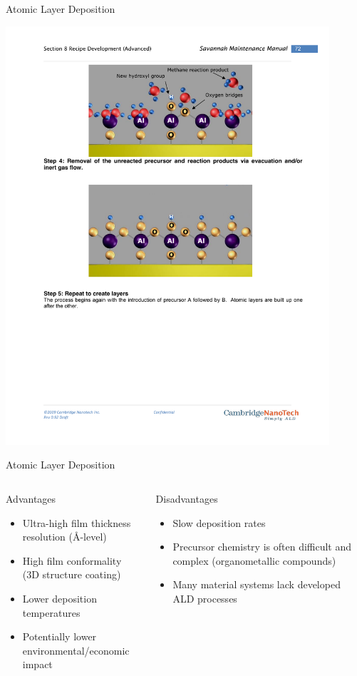 \documentclass[professionalfont]{beamer}
\begin{document}
\begin{frame}{Atomic Layer Deposition}
\begin{overprint}
		\centerline{\includegraphics[width=0.9\textwidth]{./Graphics/Synthesis/TMA6}}
	\end{overprint}
\end{frame}

\begin{frame}{Atomic Layer Deposition}
	\vspace{-0.5cm}
	\begin{columns}[t]
			\begin{block}{Advantages}
				\begin{itemize}
					\item Ultra-high film thickness resolution (\AA-level)
					\item High film conformality\\(3D structure coating)
					\item Lower deposition temperatures
					\item Potentially lower environmental/economic impact
				\end{itemize}
			\end{block}
			\begin{block}{Disadvantages}
				\begin{itemize}
					\item Slow deposition rates
					\item Precursor chemistry is often difficult and complex (organometallic compounds)
					\item Many material systems lack developed ALD processes
				\end{itemize}
			\end{block}
	\end{columns}
\end{frame}
\end{document}
